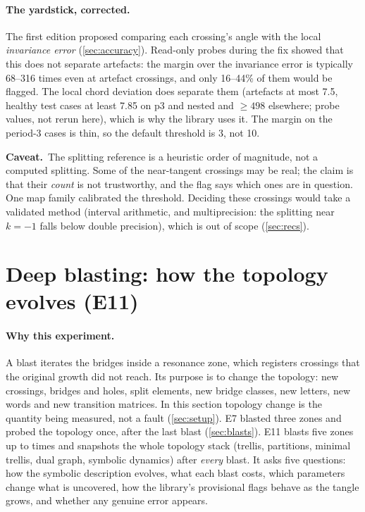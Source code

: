 \documentclass[11pt,a4paper]{article}
\newcommand{\caveat}{\par\smallskip\noindent\textbf{Caveat.}~}
\begin{document}
\paragraph{The yardstick, corrected.} The first edition proposed comparing
each crossing's angle with the local \emph{invariance error}
(\cref{sec:accuracy}). Read-only probes during the fix showed that this does
not separate artefacts: the margin over the invariance error is typically
68--316 times even at artefact crossings, and only 16--44\% of them would be
flagged. The local chord deviation does separate them (artefacts at most
7.5, healthy test cases at least 7.85 on p3 and nested and $\ge498$
elsewhere; probe values, not rerun here), which is why the library uses it.
The margin on the period-3 cases is thin, so the default threshold is 3,
not 10.

\caveat The splitting reference is a heuristic order of magnitude, not a
computed splitting. Some of the near-tangent crossings may be real; the
claim is that their \emph{count} is not trustworthy, and the flag says which
ones are in question. One map family calibrated the threshold. Deciding
these crossings would take a validated method (interval arithmetic, and
multiprecision: the splitting near $k=-1$ falls below double precision),
which is out of scope (\cref{sec:recs}).

\section{Deep blasting: how the topology evolves (E11)}
\label{sec:blastdepth}

\paragraph{Why this experiment.} A blast iterates the bridges inside a
resonance zone, which registers crossings that the original growth did not
reach. Its purpose is to change the topology: new crossings, bridges and
holes, split elements, new bridge classes, new letters, new words and new
transition matrices. In this section topology change is the quantity being
measured, not a fault (\cref{sec:setup}). E7 blasted three zones and probed
the topology once, after the last blast (\cref{sec:blasts}). E11 blasts five
zones up to \NumDeepMaxBlasts{} times and snapshots the whole topology stack
(trellis, partitions, minimal trellis, dual graph, symbolic dynamics) after
\emph{every} blast. It asks five questions: how the symbolic description
evolves, what each blast costs, which parameters change what is uncovered,
how the library's provisional flags behave as the tangle grows, and whether
any genuine error appears.
\end{document}
